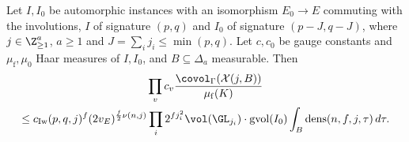 \begin{lemma}\label{pf:rows:unfoldflag}
Let $I,I_0$ be automorphic instances with an isomorphism $E_0\to E$ commuting with the involutions, $I$ of signature $(p,q)$
and $I_0$ of signature $(p-J,q-J)$, where $j\in\Z_{\ge1}^a$, $a\ge1$ and $J=\sum_ij_i\le\min(p,q)$. Let $c,c_0$ be gauge constants
and $\mu_{\mathrm f},\mu_0$ Haar measures of $I,I_0$, and $B\subseteq\Delta_a$ measurable. Then
\begin{multline*}
\prod_vc_v\frac{\covol_\Gamma(\mathcal X(j,B))}{\mu_{\mathrm f}(K)}\\
\le c_{\mathrm{Iw}}(p,q,j)^f(2v_E)^{\frac f2\rowsdimN(n,j)}\prod_i2^{fj_i^2}\vol(\GL_{j_i})\cdot\rowsgv(I_0)\int_B\rowsdens(n,f,j,\tau)\,d\tau.
\end{multline*}
\end{lemma}


